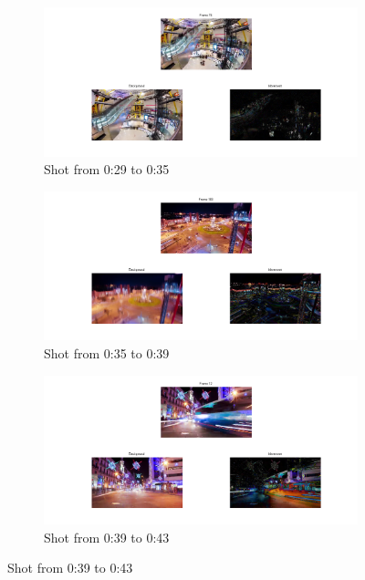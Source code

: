 \begin{figure}[htb]
	\centering
	\begin{subfigure}[t]{0.65\textwidth}
		\includegraphics[width=\textwidth]{./img/ex1/shot1.png}
		\caption{Shot from 0:29 to 0:35}
		\label{fig:shot1}
	\end{subfigure}
	
	\begin{subfigure}[t]{0.65\textwidth}
		\includegraphics[width=\textwidth]{./img/ex1/shot2.png}
		\caption{Shot from 0:35 to 0:39}
		\label{fig:shot2}
	\end{subfigure}
	
	\begin{subfigure}[t]{0.65\textwidth}
		\includegraphics[width=\textwidth]{./img/ex1/shot3.png}
		\caption{Shot from 0:39 to 0:43}
		\label{fig:shot3}
	\end{subfigure}
	

\end{figure}

